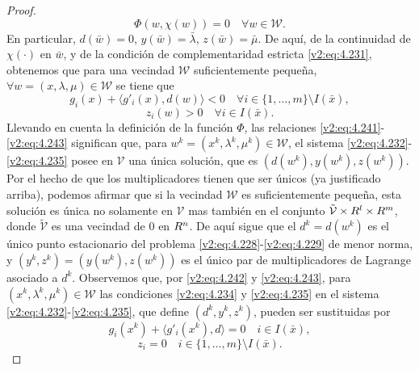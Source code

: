 \begin{proof}
    \begin{equation}
        \Phi(w, \chi(w)) = 0 \quad \forall w \in \mathcal{W}.
        \label{v2:eq:4.241}
    \end{equation}
    En particular, $d(\bar{w}) = 0$, $y(\bar{w}) = \bar{\lambda}$, $z(\bar{w}) = \bar{\mu}$. De aquí, de la continuidad de $\chi(\cdot)$ en $\bar{w}$, y de la condición de complementaridad estricta \eqref{v2:eq:4.231}, obtenemos que para una vecindad $\mathcal{W}$ suficientemente pequeña, $\forall w = (x, \lambda, \mu) \in \mathcal{W}$ se tiene que
    \begin{equation}
        g_i(x) + \langle g'_i(x), d(w) \rangle < 0 \quad \forall i \in \{1, \dots, m\} \setminus I(\bar{x}),
        \label{v2:eq:4.242}
    \end{equation}
    \begin{equation}
        z_i(w) > 0 \quad \forall i \in I(\bar{x}).
        \label{v2:eq:4.243}
    \end{equation}
    Llevando en cuenta la definición de la función $\Phi$, las relaciones \eqref{v2:eq:4.241}-\eqref{v2:eq:4.243} significan que, para $w^k = (x^k, \lambda^k, \mu^k) \in \mathcal{W}$, el sistema \eqref{v2:eq:4.232}-\eqref{v2:eq:4.235} posee en $\mathcal{V}$ una única solución, que es $(d(w^k), y(w^k), z(w^k))$. Por el hecho de que los multiplicadores tienen que ser únicos (ya justificado arriba), podemos afirmar que si la vecindad $\mathcal{W}$ es suficientemente pequeña, esta solución es única no solamente en $\mathcal{V}$ mas también en el conjunto $\tilde{\mathcal{V}} \times R^l \times R^m$, donde $\tilde{\mathcal{V}}$ es una vecindad de $0$ en $R^n$. De aquí sigue que el $d^k = d(w^k)$ es el único punto estacionario del problema \eqref{v2:eq:4.228}-\eqref{v2:eq:4.229} de menor norma, y $(y^k, z^k) = (y(w^k), z(w^k))$ es el único par de multiplicadores de Lagrange asociado a $d^k$.
    Observemos que, por \eqref{v2:eq:4.242} y \eqref{v2:eq:4.243}, para $(x^k, \lambda^k, \mu^k) \in \mathcal{W}$ las condiciones \eqref{v2:eq:4.234} y \eqref{v2:eq:4.235} en el sistema \eqref{v2:eq:4.232}-\eqref{v2:eq:4.235}, que define $(d^k, y^k, z^k)$, pueden ser sustituidas por
    \begin{equation}
        g_i(x^k) + \langle g'_i(x^k), d \rangle = 0 \quad i \in I(\bar{x}),
        \label{v2:eq:4.244}
    \end{equation}
    \begin{equation}
        z_i = 0 \quad i \in \{1, \dots, m\} \setminus I(\bar{x}).
        \label{v2:eq:4.245}
    \end{equation}

\end{proof}
